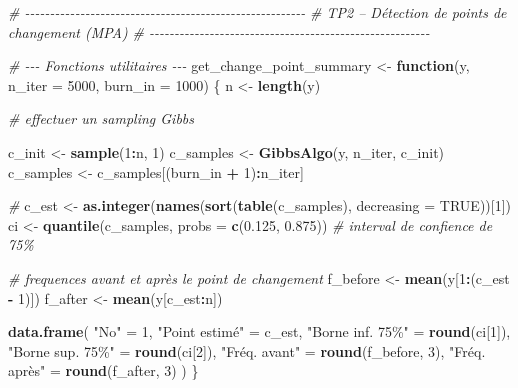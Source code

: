 \documentclass[
]{article}
\newenvironment{Shaded}{\begin{snugshade}}{\end{snugshade}}
\newcommand{\AttributeTok}[1]{\textcolor[rgb]{0.13,0.29,0.53}{#1}}
\newcommand{\CommentTok}[1]{\textcolor[rgb]{0.56,0.35,0.01}{\textit{#1}}}
\newcommand{\ConstantTok}[1]{\textcolor[rgb]{0.56,0.35,0.01}{#1}}
\newcommand{\ControlFlowTok}[1]{\textcolor[rgb]{0.13,0.29,0.53}{\textbf{#1}}}
\newcommand{\DecValTok}[1]{\textcolor[rgb]{0.00,0.00,0.81}{#1}}
\newcommand{\FloatTok}[1]{\textcolor[rgb]{0.00,0.00,0.81}{#1}}
\newcommand{\FunctionTok}[1]{\textcolor[rgb]{0.13,0.29,0.53}{\textbf{#1}}}
\newcommand{\NormalTok}[1]{#1}
\newcommand{\OtherTok}[1]{\textcolor[rgb]{0.56,0.35,0.01}{#1}}
\newcommand{\SpecialCharTok}[1]{\textcolor[rgb]{0.81,0.36,0.00}{\textbf{#1}}}
\newcommand{\StringTok}[1]{\textcolor[rgb]{0.31,0.60,0.02}{#1}}
\begin{document}
\begin{Shaded}
\begin{Highlighting}[]
\CommentTok{\# {-}{-}{-}{-}{-}{-}{-}{-}{-}{-}{-}{-}{-}{-}{-}{-}{-}{-}{-}{-}{-}{-}{-}{-}{-}{-}{-}{-}{-}{-}{-}{-}{-}{-}{-}{-}{-}{-}{-}{-}{-}{-}{-}{-}{-}{-}{-}{-}{-}{-}{-}{-}{-}{-}{-}{-}}
\CommentTok{\# TP2 – Détection de points de changement (MPA)}
\CommentTok{\# {-}{-}{-}{-}{-}{-}{-}{-}{-}{-}{-}{-}{-}{-}{-}{-}{-}{-}{-}{-}{-}{-}{-}{-}{-}{-}{-}{-}{-}{-}{-}{-}{-}{-}{-}{-}{-}{-}{-}{-}{-}{-}{-}{-}{-}{-}{-}{-}{-}{-}{-}{-}{-}{-}{-}{-}}

\CommentTok{\# {-}{-}{-} Fonctions utilitaires {-}{-}{-}}
\NormalTok{get\_change\_point\_summary }\OtherTok{\textless{}{-}} \ControlFlowTok{function}\NormalTok{(y, }\AttributeTok{n\_iter =} \DecValTok{5000}\NormalTok{, }\AttributeTok{burn\_in =} \DecValTok{1000}\NormalTok{) \{}
\NormalTok{  n }\OtherTok{\textless{}{-}} \FunctionTok{length}\NormalTok{(y)}
  
  \CommentTok{\# effectuer un sampling Gibbs}

\NormalTok{  c\_init }\OtherTok{\textless{}{-}} \FunctionTok{sample}\NormalTok{(}\DecValTok{1}\SpecialCharTok{:}\NormalTok{n, }\DecValTok{1}\NormalTok{)}
\NormalTok{  c\_samples }\OtherTok{\textless{}{-}} \FunctionTok{GibbsAlgo}\NormalTok{(y, n\_iter, c\_init)}
\NormalTok{  c\_samples }\OtherTok{\textless{}{-}}\NormalTok{ c\_samples[(burn\_in }\SpecialCharTok{+} \DecValTok{1}\NormalTok{)}\SpecialCharTok{:}\NormalTok{n\_iter]}
  
  \CommentTok{\# }
\NormalTok{  c\_est }\OtherTok{\textless{}{-}} \FunctionTok{as.integer}\NormalTok{(}\FunctionTok{names}\NormalTok{(}\FunctionTok{sort}\NormalTok{(}\FunctionTok{table}\NormalTok{(c\_samples), }\AttributeTok{decreasing =} \ConstantTok{TRUE}\NormalTok{))[}\DecValTok{1}\NormalTok{])}
\NormalTok{  ci }\OtherTok{\textless{}{-}} \FunctionTok{quantile}\NormalTok{(c\_samples, }\AttributeTok{probs =} \FunctionTok{c}\NormalTok{(}\FloatTok{0.125}\NormalTok{, }\FloatTok{0.875}\NormalTok{))  }\CommentTok{\# interval de confience de 75\%}
  
  \CommentTok{\# frequences avant et après le point de changement}
\NormalTok{  f\_before }\OtherTok{\textless{}{-}} \FunctionTok{mean}\NormalTok{(y[}\DecValTok{1}\SpecialCharTok{:}\NormalTok{(c\_est }\SpecialCharTok{{-}} \DecValTok{1}\NormalTok{)])}
\NormalTok{  f\_after  }\OtherTok{\textless{}{-}} \FunctionTok{mean}\NormalTok{(y[c\_est}\SpecialCharTok{:}\NormalTok{n])}
  
  \FunctionTok{data.frame}\NormalTok{(}
    \StringTok{"No"} \OtherTok{=} \DecValTok{1}\NormalTok{,}
    \StringTok{"Point estimé"} \OtherTok{=}\NormalTok{ c\_est,}
    \StringTok{"Borne inf. 75\%"} \OtherTok{=} \FunctionTok{round}\NormalTok{(ci[}\DecValTok{1}\NormalTok{]),}
    \StringTok{"Borne sup. 75\%"} \OtherTok{=} \FunctionTok{round}\NormalTok{(ci[}\DecValTok{2}\NormalTok{]),}
    \StringTok{"Fréq. avant"} \OtherTok{=} \FunctionTok{round}\NormalTok{(f\_before, }\DecValTok{3}\NormalTok{),}
    \StringTok{"Fréq. après"} \OtherTok{=} \FunctionTok{round}\NormalTok{(f\_after, }\DecValTok{3}\NormalTok{)}
\NormalTok{  )}
\NormalTok{\}}


\end{Highlighting}
\end{Shaded}
\end{document}
